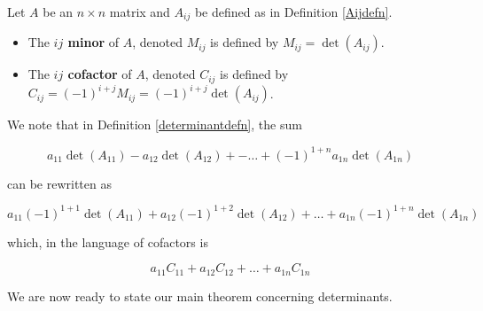 \documentclass{ximera}
\begin{document}
\begin{definition}  \label{minorcofactordefn} Let $A$ be an $n \times n$ matrix and $A_{ij}$ be defined as in Definition \ref{Aijdefn}.  

\begin{itemize}

\item The   \textbf{\boldmath $ij$ minor} of $A$, denoted $M_{ij}$ is defined by $M_{ij} = \det\left(A_{ij}\right)$. 

\item The \textbf{\boldmath $ij$ cofactor} of $A$, denoted $C_{ij}$ is defined by $C_{ij} = (-1)^{i+j}M_{ij} = (-1)^{i+j}\det\left(A_{ij}\right)$. 

\end{itemize}

\end{definition}


 

We note that in Definition \ref{determinantdefn}, the sum 

\[a_{11} \det\left(A_{11}\right)- a_{12} \det\left(A_{12}\right) + -  \ldots  + (-1)^{1+n} a_{1n} \det\left(A_{1n}\right)\]

can be rewritten as

\[a_{11} (-1)^{1+1} \det\left(A_{11}\right) + a_{12} (-1)^{1+2} \det\left(A_{12}\right) + \ldots  + a_{1n} (-1)^{1+n} \det\left(A_{1n}\right)\]

which, in the language of cofactors is

\[a_{11} C_{11} + a_{12}C_{12} + \ldots  + a_{1n}C_{1n} \]

We are now ready to state our main theorem concerning determinants.

 

\end{document}

